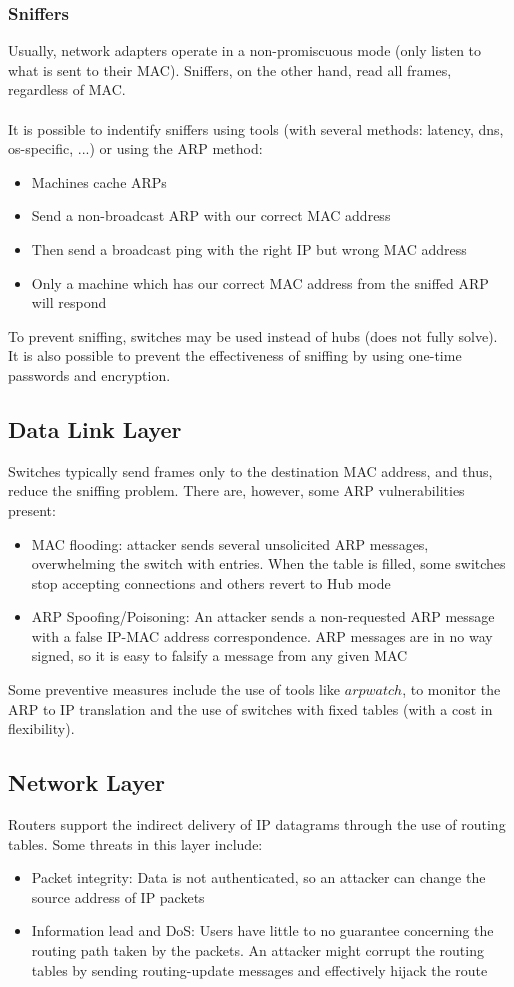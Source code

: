 \documentclass[10pt,a4paper]{report}
\begin{document}
\subsubsection{Sniffers}
Usually, network adapters operate in a non-promiscuous mode (only listen to what is sent to their MAC). Sniffers, on the other hand, read all frames, regardless of MAC.\\
\\
It is possible to indentify sniffers using tools (with several methods: latency, dns, os-specific, ...) or using the ARP method:
\begin{itemize}
\item Machines cache ARPs
\item Send a non-broadcast ARP with our correct MAC address
\item Then send a broadcast ping with the right IP but wrong MAC address
\item Only a machine which has our correct MAC address from the sniffed ARP will respond
\end{itemize}
To prevent sniffing, switches may be used instead of hubs (does not fully solve). It is also possible to prevent the effectiveness of sniffing by using one-time passwords and encryption.
\subsection{Data Link Layer}
Switches typically send frames only to the destination MAC address, and thus, reduce the sniffing problem. There are, however, some ARP vulnerabilities present:
\begin{itemize}
\item MAC flooding: attacker sends several unsolicited ARP messages, overwhelming the switch with entries. When the table is filled, some switches stop accepting connections and others revert to Hub mode
\item ARP Spoofing/Poisoning: An attacker sends a non-requested ARP message with a false IP-MAC address correspondence. ARP messages are in no way signed, so it is easy to falsify a message from any given MAC
\end{itemize}
Some preventive measures include the use of tools like $arpwatch$, to monitor the ARP to IP translation and the use of switches with fixed tables (with a cost in flexibility).
\subsection{Network Layer}
Routers support the indirect delivery of IP datagrams through the use of routing tables. Some threats in this layer include:
\begin{itemize}
\item Packet integrity: Data is not authenticated, so an attacker can change the source address of IP packets
\item Information lead and DoS: Users have little to no guarantee concerning the routing path taken by the packets. An attacker might corrupt the routing tables by sending routing-update messages and effectively hijack the route
\end{itemize}
\end{document}

